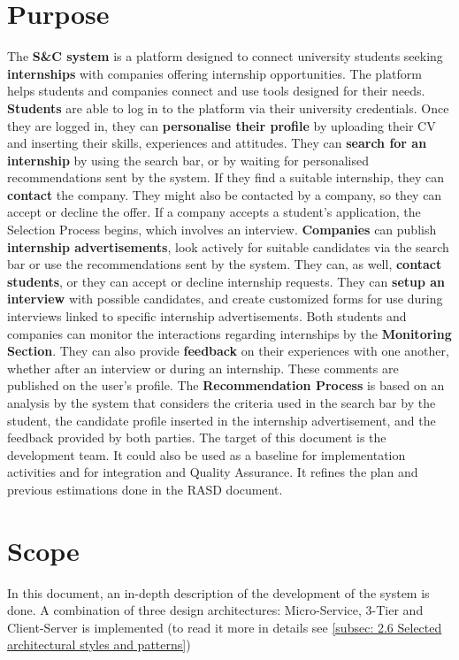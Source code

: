 \section{Purpose}
The \textbf{S\&C system} is a platform designed to connect university students seeking \textbf{internships} with companies offering internship opportunities. The platform helps students and companies connect and use tools designed for their needs.\newline
\textbf{Students} are able to log in to the platform via their university credentials. Once they are logged in, they can \textbf{personalise their profile} by uploading their CV and inserting their skills, experiences and attitudes. They can \textbf{search for an internship} by using the search bar, or by waiting for personalised recommendations sent by the system. If they find a suitable internship, they can \textbf{contact} the company. They might also be contacted by a company, so they can accept or decline the offer. If a company accepts a student's application, the Selection Process begins, which involves an interview.\newline
\textbf{Companies} can publish \textbf{internship advertisements}, look actively for suitable candidates via the search bar or use the recommendations sent by the system. They can, as well, \textbf{contact students}, or they can accept or decline internship requests. They can \textbf{setup an interview} with possible candidates, and create customized forms for use during interviews linked to specific internship advertisements.\newline
Both students and companies can monitor the interactions regarding internships by the \textbf{Monitoring Section}. They can also provide \textbf{feedback} on their experiences with one another, whether after an interview or during an internship. These comments are published on the user’s profile.\newline
The \textbf{Recommendation Process} is based on an analysis by the system that considers the criteria used in the search bar by the student, the candidate profile inserted in the internship advertisement, and the feedback provided by both parties.\newline\newline
The target of this document is the development team. It could also be used as a baseline for implementation activities and for integration and Quality Assurance. It refines the plan and previous estimations done in the RASD document.
\section{Scope}
In this document, an in-depth description of the development of the system is done. A combination of three design architectures: Micro-Service, 3-Tier and Client-Server is implemented (to read it more in details see \autoref{subsec: 2.6 Selected architectural styles and patterns})
